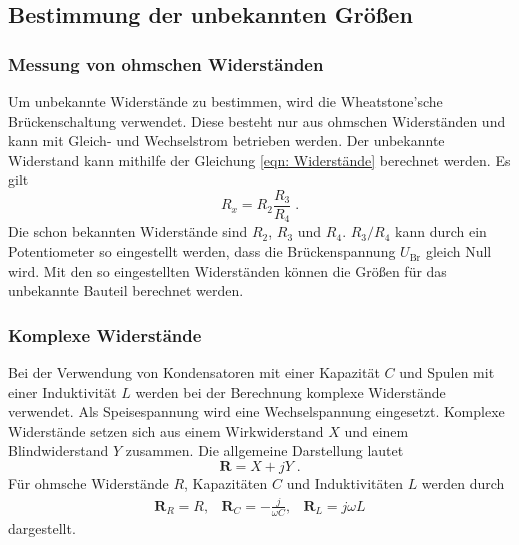 \subsection{Bestimmung der unbekannten Größen}

    \subsubsection{Messung von ohmschen Widerständen} \label{sec:Wheatstone}

        Um unbekannte Widerstände zu bestimmen, wird die Wheatstone'sche Brückenschaltung verwendet.
        Diese besteht nur aus ohmschen Widerständen und kann mit Gleich- und Wechselstrom betrieben werden.
        Der unbekannte Widerstand kann mithilfe der Gleichung \eqref{eqn: Widerstände} berechnet werden.
        Es gilt
        \begin{equation}
            R_x = R_2 \frac{R_3}{R_4} \; . \label{eqn: Rx}
        \end{equation}
        Die schon bekannten Widerstände sind $R_2$, $R_3$ und $R_4$.
        $R_3/R_4$ kann durch ein Potentiometer so eingestellt werden,
        dass die Brückenspannung $U_\text{Br}$ gleich Null wird.
        Mit den so eingestellten Widerständen können die Größen für das unbekannte Bauteil berechnet werden.

    \subsubsection{Komplexe Widerstände}

        Bei der Verwendung von Kondensatoren mit einer Kapazität $C$ und Spulen mit einer Induktivität $L$ werden bei der Berechnung
        komplexe Widerstände verwendet. Als Speisespannung wird eine Wechselspannung eingesetzt.
        Komplexe Widerstände setzen sich aus einem Wirkwiderstand $X$ und einem Blindwiderstand $Y$ zusammen.
        Die allgemeine Darstellung lautet
        \begin{equation}
            \symbf{R} = X + jY \; .
        \end{equation}
        Für ohmsche Widerstände $R$, Kapazitäten $C$ und Induktivitäten $L$ werden durch
        \begin{align}
            \symbf{R}_R = R, & \symbf{R}_C = - \frac{j}{\omega C}, & \symbf{R}_L = j \omega L
        \end{align}
        dargestellt.

